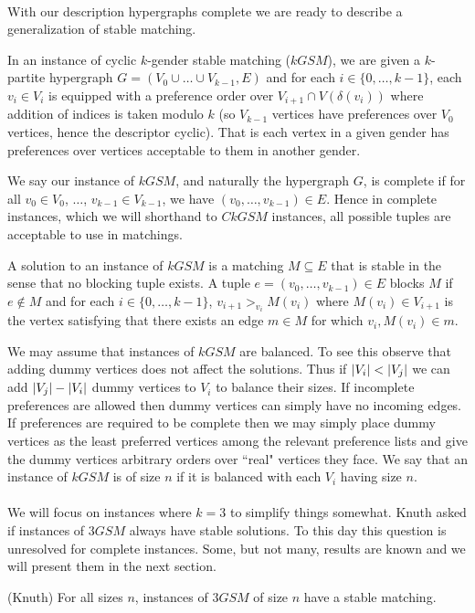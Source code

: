 \paragraph{}
With our description hypergraphs complete we are ready to describe a generalization of stable matching.
\begin{definition}
In an instance of cyclic $k$-gender stable matching ($kGSM$), we are given a $k$-partite hypergraph $G=(V_0 \cup \dots \cup V_{k-1}, E)$ and for each $i \in \{0,\dots,k-1\}$, each $v_i \in V_i$ is equipped with a preference order over $V_{i+1} \cap V(\delta(v_i))$ where addition of indices is taken modulo $k$ (so $V_{k-1}$ vertices have preferences over $V_0$ vertices, hence the descriptor cyclic). That is each vertex in a given gender has preferences over vertices acceptable to them in another gender. \end{definition}
\begin{definition}
We say our instance of $kGSM$, and naturally the hypergraph $G$, is complete if for all $v_0 \in V_0$, $\dots$, $v_{k-1} \in V_{k-1}$, we have $(v_0,\dots,v_{k-1}) \in E$. Hence in complete instances, which we will shorthand to $CkGSM$ instances, all possible tuples are acceptable to use in matchings.
\end{definition}
\begin{definition}
A solution to an instance of $kGSM$ is a matching $M \subseteq E$ that is stable in the sense that no blocking tuple exists. A tuple $e=(v_0,\dots, v_{k-1}) \in E$ blocks $M$ if $e\not\in M$ and for each $i \in \{0,\dots, k-1\}$, $v_{i+1} >_{v_i} M(v_i)$ where $M(v_i) \in V_{i+1}$ is the vertex satisfying that there exists an edge $m \in M$ for which $v_i, M(v_i) \in m$.
\end{definition}
\begin{note}
We may assume that instances of $kGSM$ are balanced. To see this observe that adding dummy vertices does not affect the solutions. Thus if $\left|V_i\right| < \left|V_j\right|$ we can add $\left|V_j\right| - \left|V_i\right|$ dummy vertices to $V_i$ to balance their sizes. If incomplete preferences are allowed then dummy vertices can simply have no incoming edges. If preferences are required to be complete then we may simply place dummy vertices as the least preferred vertices among the relevant preference lists and give the dummy vertices arbitrary orders over ``real" vertices they face. We say that an instance of $kGSM$ is of size $n$ if it is balanced with each $V_i$ having size $n$.
\end{note}
\paragraph{}
We will focus on instances where $k=3$ to simplify things somewhat. Knuth asked if instances of $3GSM$ always have stable solutions. To this day this question is unresolved for complete instances. Some, but not many, results are known and we will present them in the next section.
\begin{conjecture}\label{conj:unstab}
(Knuth) For all sizes $n$, instances of $3GSM$ of size $n$ have a stable matching.
\end{conjecture} 

